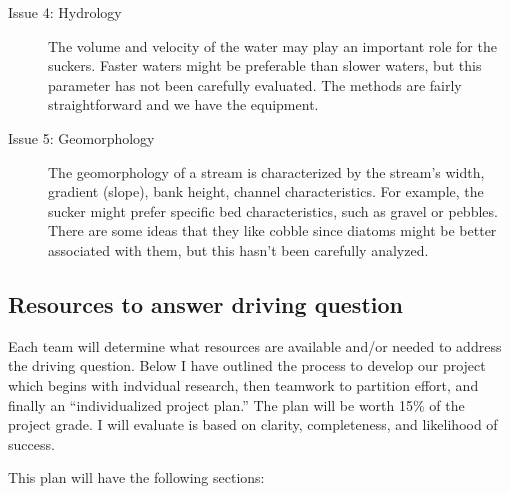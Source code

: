\documentclass{tufte-handout}\usepackage[]{graphicx}\usepackage[]{color}
\begin{document}
\begin{description}
  \item[Issue 4: Hydrology] The volume and velocity of the water may play an important role for the suckers. Faster waters might be preferable than slower waters, but this parameter has not been carefully evaluated. The methods are fairly straightforward and we have the equipment.
  
  \item[Issue 5: Geomorphology] The geomorphology of a stream is characterized by the stream's width, gradient (slope), bank height, channel characteristics. For example, the sucker might prefer specific bed characteristics, such as gravel or pebbles. There are some ideas that they like cobble since diatoms might be better associated with them, but this hasn't been carefully analyzed.
\end{description}


\subsection{Resources to answer driving question}

Each team will determine what resources are available and/or needed to address the driving question. Below I have outlined the process to develop our project which begins with indvidual research, then teamwork to partition effort, and finally an ``individualized project plan.'' The plan will be worth 15\% of the project grade. I will evaluate is based on clarity, completeness, and likelihood of success. 

This plan will have the following sections: 
\end{document}
